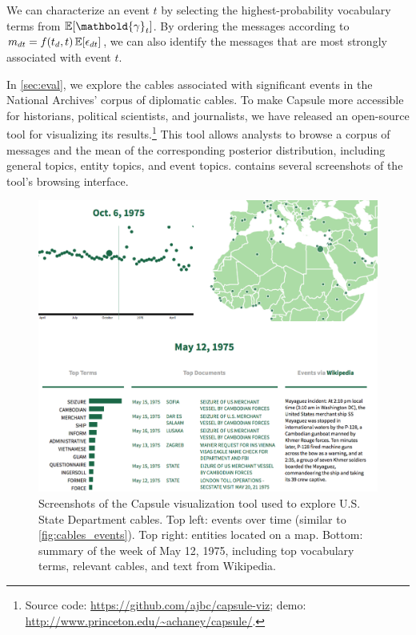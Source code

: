 We can characterize an event $t$ by selecting the highest-probability
vocabulary terms from $\E[\mathbold{\gamma}_t]$. By ordering the
messages according to $m_{dt} = f(t_d, t)\,\mathbb{E}[\epsilon_{dt}]$, we can
also identify the messages that are most strongly associated with
event $t$.

In \cref{sec:eval}, we explore the cables associated with
significant events in the National Archives' corpus of diplomatic
cables. To make Capsule more accessible for historians, political
scientists, and journalists, we have released an open-source tool for
visualizing its results.\footnote{Source code:
  \url{https://github.com/ajbc/capsule-viz}; demo:
  \url{http://www.princeton.edu/~achaney/capsule/}.} This tool allows
analysts to browse a corpus of messages and the mean of the
corresponding posterior distribution, including general topics, entity
topics, and event topics.  contains several screenshots
of the tool's browsing interface.

\begin{figure}
\centering
\includegraphics[width=\linewidth]{fig/viz.png}
\caption{Screenshots of the Capsule visualization tool used to explore
  U.S. State Department cables. Top left: events over time (similar to
  \cref{fig:cables_events}). Top right: entities located on a
  map. Bottom: summary of the week of May 12, 1975, including top
  vocabulary terms, relevant cables, and text from Wikipedia.}
\label{fig:viz}
\end{figure}
